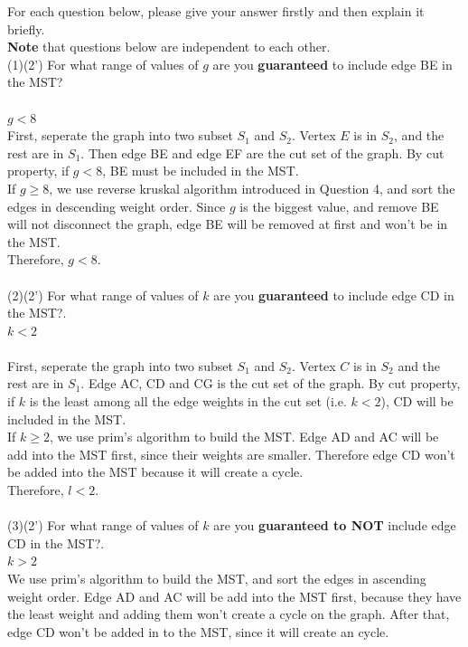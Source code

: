 \documentclass[10.5pt]{article}
\begin{document}
For each question below, please give your answer firstly and then explain it briefly.\\
\textbf{Note} that questions below are independent to each other. \\
(1)(2') For what range of values of $g$ are you \textbf{guaranteed} to include edge BE in the MST?\\
\\
$g< 8$\\
First, seperate the graph into two subset $S_1$ and $S_2$. Vertex $E$ is in $S_2$, and the rest are in $S_1$. Then edge BE and edge EF are the cut set of the graph. By cut property, if $g < 8$, BE must be included in the MST.\\
If $g \ge 8$, we use reverse kruskal algorithm introduced in Question 4, and sort the edges in descending weight order. Since $g$ is the biggest value, and remove BE will not disconnect the graph, edge BE will be removed at first and won't be in the MST.\\
Therefore, $g < 8$.\\
\\
(2)(2') For what range of values of $k$ are you \textbf{guaranteed} to include edge CD in the MST?.\\
$k<2$\\
\\
First, seperate the graph into two subset $S_1$ and $S_2$. Vertex $C$ is in $S_2$ and the rest are in $S_1$. Edge AC, CD and CG is the cut set of the graph. By cut property, if $k$ is the least among all the edge weights in the cut set (i.e. $k < 2$), CD will be included in the MST.\\
If $k \ge 2$, we use prim's algorithm to build the MST. Edge AD and AC will be add into the MST first, since their weights are smaller. Therefore edge CD won't be added into the MST because it will create a cycle.\\
Therefore, $l < 2$.\\
\\
(3)(2') For what range of values of $k$ are you \textbf{guaranteed to NOT} include edge CD in the MST?.\\
$k > 2$\\
We use prim's algorithm to build the MST, and sort the edges in ascending weight order. Edge AD and AC will be add into the MST first, because they have the least weight and adding them won't create a cycle on the graph. After that, edge CD won't be added in to the MST, since it will create an cycle.\\
\end{document}

